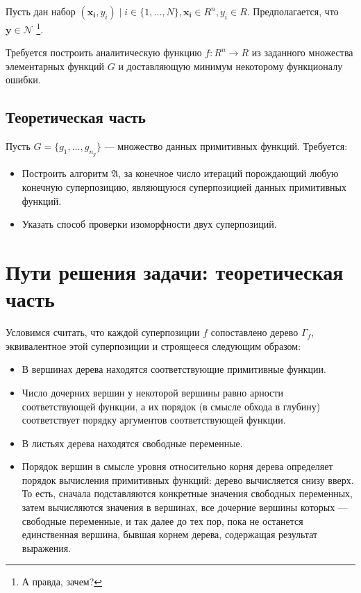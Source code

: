 \documentclass[12pt,a4paper]{amsart}
\begin{document}
Пусть дан набор $(\mathbf{x_i}, y_i) \mid i \in \{1, \dots, N\}, \mathbf{x_i} \in R^n, y_i \in R$.
Предполагается, что $\mathbf{y} \in \mathcal{N}$ \footnote{А правда, зачем?}.

Требуется построить аналитическую функцию $f : R^n \rightarrow R$ из заданного
множества элементарных функций $G$ и доставляющую минимум некоторому функционалу
ошибки.

\subsection{Теоретическая часть}

Пусть $G = \{ g_1, \dots, g_{n_g} \}$ --- множество данных примитивных функций.
Требуется:

\begin{itemize}
  \item Построить алгоритм $\mathfrak{A}$, за конечное число итераций
	порождающий любую конечную суперпозицию, являющуюся суперпозицией данных
	примитивных функций.
  \item Указать способ проверки изоморфности двух суперпозиций.
\end{itemize}

\section{Пути решения задачи: теоретическая часть}

Условимся считать, что каждой суперпозиции $f$ сопоставлено дерево $\Gamma_f$,
эквивалентное этой суперпозиции и строящееся следующим образом:

\begin{itemize}
  \item В вершинах дерева находятся соответствующие примитивные функции.
  \item Число дочерних вершин у некоторой вершины равно арности соответствующей
	функции, а их порядок (в смысле обхода в глубину) соответствует порядку
	аргументов соответствующей функции.
  \item В листьях дерева находятся свободные переменные.
  \item Порядок вершин в смысле уровня относительно корня дерева определяет
	порядок вычисления примитивных функций: дерево вычисляется снизу вверх.
	То есть, сначала подставляются конкретные значения свободных переменных,
	затем вычисляются значения в вершинах, все дочерние вершины которых ---
	свободные переменные, и так далее до тех пор, пока не останется
	единственная вершина, бывшая корнем дерева, содержащая результат выражения.
\end{itemize}
\end{document}
